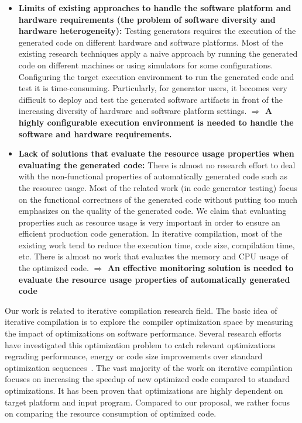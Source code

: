 \begin{itemize}
\item \textbf{Limits of existing approaches to handle the software platform and hardware requirements (the problem of software diversity and hardware heterogeneity):} Testing generators requires the execution of the generated code on different hardware and software platforms. Most of the existing research techniques apply a naive approach by running the generated code on different machines or using simulators for some configurations. Configuring the target execution environment to run the generated code and test it is time-consuming. Particularly, for generator users, it becomes very difficult to deploy and test the generated software artifacts in front of the increasing diversity of hardware and software platform settings.\newline
\textbf{$\Rightarrow$ A highly configurable execution environment is needed to handle the software and hardware requirements.} 

\item \textbf{Lack of solutions that evaluate the resource usage properties when evaluating the generated code:} There is almost no research effort to deal with the non-functional properties of automatically generated code such as the resource usage. Most of the related work (in code generator testing) focus on the functional correctness of the generated code without putting too much emphasizes on the quality of the generated code. We claim that evaluating properties such as resource usage is very important in order to ensure an efficient production code generation. In iterative compilation, most of the existing work tend to reduce the execution time, code size, compilation time, etc. There is almost no work that evaluates the memory and CPU usage of the optimized code.
\newline
\textbf{$\Rightarrow$ An effective monitoring solution is needed to evaluate the resource usage properties of automatically generated code}
  
\end{itemize}
\iffalse
Our work is related to iterative compilation research field.
The basic idea of iterative compilation is to explore the compiler optimization space by measuring the impact of optimizations on software performance.
Several research efforts have investigated this optimization problem to catch relevant optimizations regrading performance, energy or code size improvements over standard optimization sequences~\cite{almagor2004finding,hoste2008cole,pan2006fast,zhong2009tuning,pallister2015identifying,chen2012deconstructing,sandran2012genetic,martins2014exploration,fursin2008milepost,lin2008automatic,schulte2014post}. 
The vast majority of the work on iterative compilation focuses on increasing the speedup of new optimized code compared to standard optimizations. 
It has been proven that optimizations are highly dependent on target platform and input program. Compared to our proposal, we rather focus on comparing the resource consumption of optimized code.

